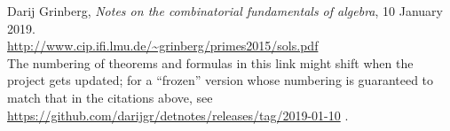 \documentclass[paper=a4, fontsize=12pt]{scrartcl} %
\theoremstyle{plainsl}
\theoremstyle{definition}
\theoremstyle{remark}
\begin{document}
\begin{thebibliography}{99999999}                                                                                         %



Darij Grinberg,
\textit{Notes on the combinatorial fundamentals of algebra},
10 January 2019. \\
\url{http://www.cip.ifi.lmu.de/~grinberg/primes2015/sols.pdf}
\\
The numbering of theorems and formulas in this link might shift
when the project gets updated; for a ``frozen'' version whose
numbering is guaranteed to match that in the citations above, see
\url{https://github.com/darijgr/detnotes/releases/tag/2019-01-10} .

\end{thebibliography}
\end{document}
